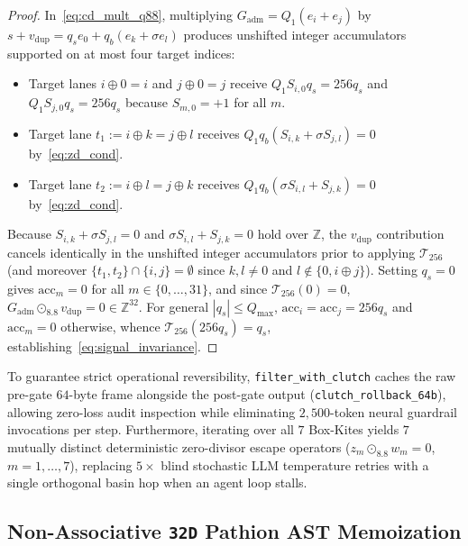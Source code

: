 \documentclass[11pt]{article}
\theoremstyle{plain}
\theoremstyle{definition}
\begin{document}
\begin{proof}
In~\eqref{eq:cd_mult_q88}, multiplying $G_{\mathrm{adm}} = Q_1(e_i + e_j)$ by $s + v_{\mathrm{dup}} = q_s e_0 + q_b(e_k + \sigma e_l)$ produces unshifted integer accumulators supported on at most four target indices:
\begin{itemize}
  \item Target lanes $i \oplus 0 = i$ and $j \oplus 0 = j$ receive $Q_1 S_{i,0} q_s = 256 q_s$ and $Q_1 S_{j,0} q_s = 256 q_s$ because $S_{m,0} = +1$ for all $m$.
  \item Target lane $t_1 := i \oplus k = j \oplus l$ receives $Q_1 q_b (S_{i,k} + \sigma S_{j,l}) = 0$ by~\eqref{eq:zd_cond}.
  \item Target lane $t_2 := i \oplus l = j \oplus k$ receives $Q_1 q_b (\sigma S_{i,l} + S_{j,k}) = 0$ by~\eqref{eq:zd_cond}.
\end{itemize}
Because $S_{i,k} + \sigma S_{j,l} = 0$ and $\sigma S_{i,l} + S_{j,k} = 0$ hold over $\mathbb{Z}$, the $v_{\mathrm{dup}}$ contribution cancels identically in the unshifted integer accumulators prior to applying $\mathcal{T}_{256}$ (and moreover $\{t_1, t_2\} \cap \{i, j\} = \emptyset$ since $k, l \neq 0$ and $l \notin \{0, i \oplus j\}$). Setting $q_s = 0$ gives $\mathrm{acc}_m = 0$ for all $m \in \{0,\dots,31\}$, and since $\mathcal{T}_{256}(0) = 0$, $G_{\mathrm{adm}} \odot_{8.8} v_{\mathrm{dup}} = 0 \in \mathbb{Z}^{32}$. For general $|q_s| \le Q_{\max}$, $\mathrm{acc}_i = \mathrm{acc}_j = 256 q_s$ and $\mathrm{acc}_m = 0$ otherwise, whence $\mathcal{T}_{256}(256 q_s) = q_s$, establishing~\eqref{eq:signal_invariance}.
\end{proof}

To guarantee strict operational reversibility, \texttt{filter\_with\_clutch} caches the raw pre-gate $64$-byte frame alongside the post-gate output (\texttt{clutch\_rollback\_64b}), allowing zero-loss audit inspection while eliminating $2{,}500$-token neural guardrail invocations per step. Furthermore, iterating over all $7$ Box-Kites yields $7$ mutually distinct deterministic zero-divisor escape operators ($z_m \odot_{8.8} w_m = 0$, $m = 1,\dots,7$), replacing $5\times$ blind stochastic LLM temperature retries with a single orthogonal basin hop when an agent loop stalls.

\subsection{Non-Associative \texttt{32D} Pathion AST Memoization}\label{sec:ast}
\end{document}
